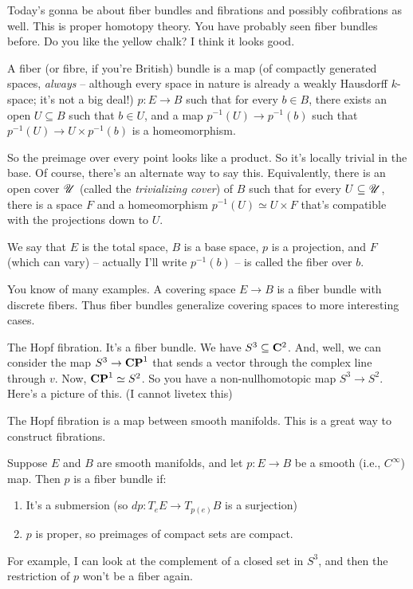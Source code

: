 Today's gonna be about fiber bundles and fibrations and possibly cofibrations as well. This is proper homotopy theory.  You have probably seen fiber bundles before. Do you like the yellow chalk? I think it looks good.
\begin{definition}
    A fiber (or fibre, if you're British) bundle is a map (of compactly generated spaces, \emph{always} -- although every space in nature is already a weakly Hausdorff $k$-space; it's not a big deal!) $p:E\to B$ such that for every $b\in B$, there exists an open $U\subseteq B$ such that $b\in U$, and a map $p^{-1}(U)\to p^{-1}(b)$ such that $p^{-1}(U)\to U\times p^{-1}(b)$ is a homeomorphism.
\end{definition}
So the preimage over every point looks like a product. So it's locally trivial in the base. Of course, there's an alternate way to say this. Equivalently, there is an open cover $\mathscr U$ (called the \emph{trivializing cover}) of $B$ such that for every $U\subseteq \mathscr U$, there is a space $F$ and a homeomorphism $p^{-1}(U)\simeq U\times F$ that's compatible with the projections down to $U$.
\begin{remark}
    We say that $E$ is the total space, $B$ is a base space, $p$ is a projection, and $F$ (which can vary) -- actually I'll write $p^{-1}(b)$ -- is called the fiber over $b$.
\end{remark}
\begin{example}
    You know of many examples. A covering space $E\to B$ is a fiber bundle with discrete fibers. Thus fiber bundles generalize covering spaces to more interesting cases.
\end{example}
\begin{example}
    The Hopf fibration. It's a fiber bundle. We have $S^3\subseteq \mathbf C^2$. And, well, we can consider the map $S^3\to \mathbf{CP}^1$ that sends a vector through the complex line through $v$. Now, $\mathbf{CP}^1\simeq S^2$. So you have a non-nullhomotopic map $S^3\to S^2$. Here's a picture of this. (I cannot livetex this)

    The Hopf fibration is a map between smooth manifolds. This is a great way to construct fibrations.
\end{example}
\begin{theorem}[Ehresmann]
    Suppose $E$ and $B$ are smooth manifolds, and let $p:E\to B$ be a smooth (i.e., $C^\infty$) map. Then $p$ is a fiber bundle if:
    \begin{enumerate}
	\item It's a submersion (so $dp:T_e E\to T_{p(e)} B$ is a surjection)
	\item $p$ is proper, so preimages of compact sets are compact.
    \end{enumerate}
\end{theorem}
For example, I can look at the complement of a closed set in $S^3$, and then the restriction of $p$ won't be a fiber again.

